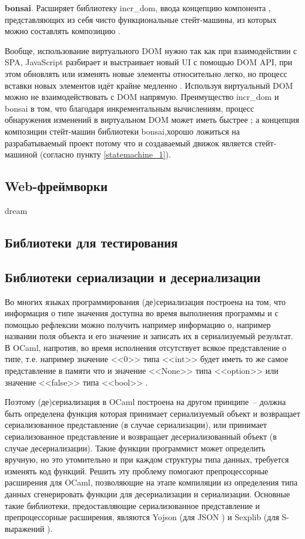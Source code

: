 \textbf{bonsai}. Расширяет библиотеку incr\_dom, ввода концепцию компонента \cite{bonsai-history},
представляющих из себя чисто функциональные стейт-машины, из которых можно составлять композицию \cite{janestreet-bonsai}.

Вообще, использование виртуального DOM нужно так как при взаимодействии с SPA, JavaScript разбирает и выстраивает новый UI
с помощью DOM API, при этом обновлять или изменять новые элементы относительно легко, но процесс вставки новых элементов
идёт крайне медленно \cite[с. 72]{react-book}. Используя виртуальный DOM можно не взаимодействовать с DOM напрямую.
Преимущество incr\_dom и bonsai в том, что благодаря инкрементальным вычислениям, процесс обнаружения изменений в
виртуальном DOM может иметь быстрее \cite{minsky-incrdom};
а концепция композиции стейт-машин библиотеки bonsai,хорошо ложиться на
разрабатываемый проект потому что и создаваемый движок является стейт-машиной (согласно пункту \ref{statemachine_1}).

\subsection{Web-фреймворки}

dream \TODO

\subsection{Библиотеки для тестирования}

\TODO

\subsection{Библиотеки сериализации и десериализации}

Во многих языках программирования (де)сериализация построена на том, что
информация о типе значения доступна во время выполнения программы и с помощью рефлексии можно
получить например информацию о, например названии поля объекта и его значение и записать их в
сериализуемый результат. В OCaml, напротив, во время исполнения отсутствует всякое представление
о типе, т.е. например значение <<0>> типа <<int>> будет иметь то же самое представление в памяти что и
значение <<None>> типа <<option>> или значение <<false>> типа <<bool>> \cite{rwo-runtime-memory}.

Поэтому (де)сериализация в OCaml построена на другом принципе~-- должна быть определена функция которая
принимает сериализуемый объект и возвращает сериализованное представление (в случае сериализации),
или принимает сериализованное представление и возвращает десериализованный объект (в случае десериализации).
Такие функции программист может определить вручную, но это утомительно и при каждом структуры типа данных,
требуется изменять код функций. Решить эту проблему помогают препроцессорные расширения для OCaml, позволяющие
на этапе компиляции из определения типа данных сгенерировать функции для десериализации и сериализации.
Основные такие библиотеки, предоставляющие сериализованное представление и препроцессорные расширения,
являются Yojson (для JSON \cite{rwo-json}) и Sexplib (для S-выражений \cite{rwo-sexp}).

